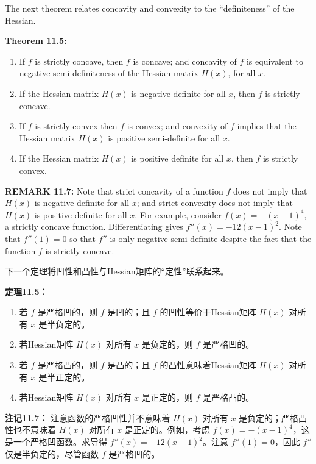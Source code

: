 \begin{original}
The next theorem relates concavity and convexity to the ``definiteness'' of the Hessian.

\textbf{Theorem 11.5:}
\begin{enumerate}
\item If $f$ is strictly concave, then $f$ is concave; and concavity of $f$ is equivalent to negative semi-definiteness of the Hessian matrix $H(x)$, for all $x$.
\item If the Hessian matrix $H(x)$ is negative definite for all $x$, then $f$ is strictly concave.
\item If $f$ is strictly convex then $f$ is convex; and convexity of $f$ implies that the Hessian matrix $H(x)$ is positive semi-definite for all $x$.
\item If the Hessian matrix $H(x)$ is positive definite for all $x$, then $f$ is strictly convex.
\end{enumerate}

\textbf{REMARK 11.7:} Note that strict concavity of a function $f$ does not imply that $H(x)$ is negative definite for all $x$; and strict convexity does not imply that $H(x)$ is positive definite for all $x$. For example, consider $f(x) = -(x-1)^4$, a strictly concave function. Differentiating gives $f''(x) = -12(x-1)^2$. Note that $f''(1) = 0$ so that $f''$ is only negative semi-definite despite the fact that the function $f$ is strictly concave.
\end{original}
\begin{translation}
下一个定理将凹性和凸性与Hessian矩阵的``定性''联系起来。

\textbf{定理11.5：}
\begin{enumerate}
\item 若 $f$ 是严格凹的，则 $f$ 是凹的；且 $f$ 的凹性等价于Hessian矩阵 $H(x)$ 对所有 $x$ 是半负定的。
\item 若Hessian矩阵 $H(x)$ 对所有 $x$ 是负定的，则 $f$ 是严格凹的。
\item 若 $f$ 是严格凸的，则 $f$ 是凸的；且 $f$ 的凸性意味着Hessian矩阵 $H(x)$ 对所有 $x$ 是半正定的。
\item 若Hessian矩阵 $H(x)$ 对所有 $x$ 是正定的，则 $f$ 是严格凸的。
\end{enumerate}

\textbf{注记11.7：} 注意函数的严格凹性并不意味着 $H(x)$ 对所有 $x$ 是负定的；严格凸性也不意味着 $H(x)$ 对所有 $x$ 是正定的。例如，考虑 $f(x) = -(x-1)^4$，这是一个严格凹函数。求导得 $f''(x) = -12(x-1)^2$。注意 $f''(1) = 0$，因此 $f''$ 仅是半负定的，尽管函数 $f$ 是严格凹的。
\end{translation}

